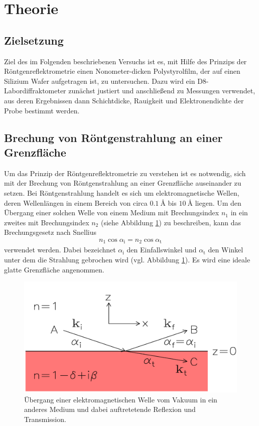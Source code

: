 \section{Theorie}
\label{sec:Theorie}

\subsection{Zielsetzung}
\label{subsec:zielsetzung}
Ziel des im Folgenden beschriebenen Versuchs ist es,
mit Hilfe des Prinzips der Röntgenreflektrometrie
einen Nonometer-dicken Polystyrolfilm, der auf einen Silizium
Wafer aufgetragen ist, zu untersuchen.
Dazu wird ein D8-Labordiffraktometer zunächst justiert und anschließend zu
Messungen verwendet, aus deren Ergebnissen dann Schichtdicke, Rauigkeit und
Elektronendichte der Probe bestimmt werden.


\subsection{Brechung von Röntgenstrahlung an einer Grenzfläche}
\label{subsec:einschicht}
Um das Prinzip der Röntgenreflektrometrie zu verstehen ist es notwendig,
sich mit der Brechung von Röntgenstrahlung an einer Grenzfläche auseinander
zu setzen.
Bei Röntgenstrahlung handelt es sich um elektromagnetische Wellen, deren
Wellenlängen in einem Bereich von circa $\SI{0.1}{\angstrom}$ bis
$\SI{10}{\angstrom}$ liegen.
Um den Übergang einer solchen Welle von einem Medium mit Brechungsindex $n_{1}$
in ein zweites mit Brechungsindex $n_{2}$ (siehe Abbildung \ref{fig:einschicht})
zu beschreiben, kann das Brechungsgesetz nach Snellius
\begin{align}
  n_{1} \cos\alpha_{\text{i}} = n_{2} \cos\alpha_{\text{t}}
  \label{eqn:snellius}
\end{align}
verwendet werden. Dabei bezeichnet $\alpha_{\text{i}}$ den Einfallswinkel
und $\alpha_{\text{t}}$ den Winkel unter dem die Strahlung gebrochen wird
(vgl. Abbildung \ref{fig:einschicht}). Es wird eine ideale glatte Grenzfläche
angenommen. \\

\FloatBarrier
\begin{figure}
  \includegraphics[width=\textwidth]{bilder/einschicht.png}
  \caption{Übergang einer elektromagnetischen Welle vom Vakuum in ein
            anderes Medium und dabei auftretetende Reflexion und Transmission.\cite{sample}}
  \label{fig:einschicht}
\end{figure}
\FloatBarrier

